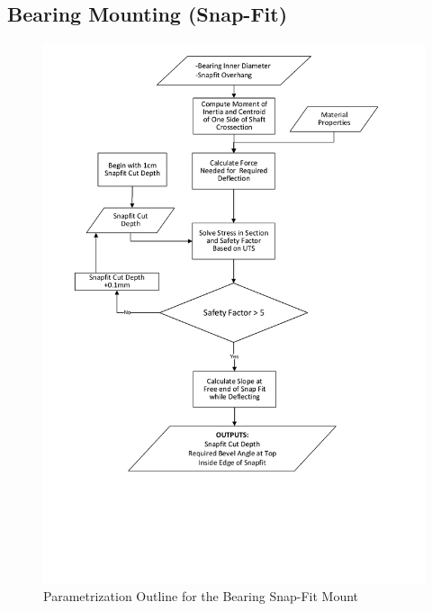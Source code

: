 \documentclass[../main.tex]{subfiles}
\begin{document}
\subsection{Bearing Mounting (Snap-Fit)} \label{snapFit}

\begin{figure}[H]
	\centering
	\includegraphics[width=.8\linewidth]{img/paramaterization/snapFit.pdf}
	\caption{Parametrization Outline for the Bearing Snap-Fit Mount}
	\label{fig:snapFitParametrization}
\end{figure}
\end{document}
